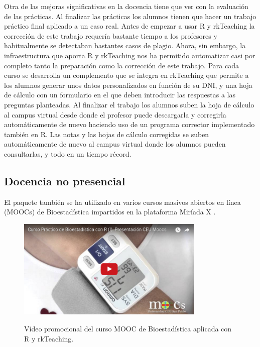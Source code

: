 \documentclass[a4paper,10pt,twoside]{article}
\newcommand{\rkteaching}{\textsf{rkTeaching}}
\begin{document}
Otra de las mejoras significativas en la docencia tiene que ver con la evaluación de las prácticas.
Al finalizar las prácticas los alumnos tienen que hacer un trabajo práctico final aplicado a un caso real.
Antes de empezar a usar R y \rkteaching{} la corrección de este trabajo requería bastante tiempo a los profesores y
habitualmente se detectaban bastantes casos de plagio.
Ahora, sin embargo, la infraestructura que aporta R y \rkteaching{} nos ha permitido automatizar casi por completo tanto
la preparación como la corrección de este trabajo. 
Para cada curso se desarrolla un complemento que se integra en \rkteaching{} que permite a los alumnos generar unos
datos personalizados en función de su DNI, y una hoja de cálculo con un formulario en el que deben introducir las respuestas a
las preguntas planteadas.
Al finalizar el trabajo los alumnos suben la hoja de cálculo al campus virtual desde donde el profesor puede
descargarla y corregirla automáticamente de nuevo haciendo uso de un programa corrector implementado también en R.
Las notas y las hojas de cálculo corregidas se suben automáticamente de nuevo al campus virtual donde los alumnos pueden
consultarlas, y todo en un tiempo récord. 

\subsection{Docencia no presencial}
El paquete también se ha utilizado en varios cursos masivos abiertos en línea (MOOCs) de Bioestadística impartidos
en la plataforma Miríada X \cite{sanchez2013curso}.

\begin{figure}[htp]
\begin{center}
\href{https://youtu.be/BTFOsbzInZo}{\includegraphics[width=0.8\textwidth]{img/mooc.png}}
\caption{Vídeo promocional del curso MOOC de Bioestadística aplicada con R y rkTeaching.}
\label{f:mooc}
\end{center}
\end{figure}
\end{document}
